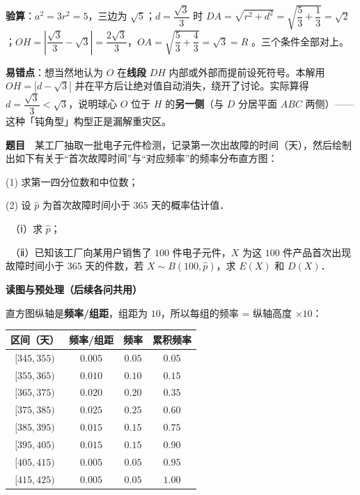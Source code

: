 \begin{gktip}
\textbf{验算}：$a^2=3r^2=5$，三边为 $\sqrt5$；$d=\dfrac{\sqrt3}{3}$ 时 $DA=\sqrt{r^2+d^2}=\sqrt{\dfrac53+\dfrac13}=\sqrt2$ ；$OH=\left|\dfrac{\sqrt3}{3}-\sqrt3\right|=\dfrac{2\sqrt3}{3}$，$OA=\sqrt{\dfrac53+\dfrac43}=\sqrt3=R$ 。三个条件全部对上。

\textbf{易错点}：想当然地认为 $O$ 在\textbf{线段} $DH$ 内部或外部而提前设死符号。本解用 $OH=\left|d-\sqrt3\right|$ 并在平方后让绝对值自动消失，绕开了讨论。实际算得 $d=\dfrac{\sqrt3}{3}<\sqrt3$，说明球心 $O$ 位于 $H$ 的\textbf{另一侧}（与 $D$ 分居平面 $ABC$ 两侧）——这种「钝角型」构型正是漏解重灾区。
\end{gktip}

\par\medskip



\textbf{题目}　某工厂抽取一批电子元件检测，记录第一次出故障的时间（天），然后绘制出如下有关于“首次故障时间”与“对应频率”的频率分布直方图：

\begin{center}\end{center}

  (1) 求第一四分位数和中位数；

  (2) 设 $\hat{p}$ 为首次故障时间小于 $365$ 天的概率估计值．

  　（ⅰ）求 $\hat{p}$；

  　（ⅱ）已知该工厂向某用户销售了 $100$ 件电子元件，$X$ 为这 $100$ 件产品首次出现故障时间小于 $365$ 天的件数，若 $X\sim B(100,\hat{p})$，求 $E(X)$ 和 $D(X)$．

\par\medskip

\textbf{读图与预处理（后续各问共用）}

直方图纵轴是\textbf{频率/组距}，组距为 $10$，所以每组的频率 = 纵轴高度 $\times10$：

\begin{center}
\begin{tabular}{cccc}
\toprule
区间（天） & 频率/组距 & 频率 & 累积频率 \\
\midrule
$[345,355)$ & $0.005$ & $0.05$ & $0.05$ \\
$[355,365)$ & $0.010$ & $0.10$ & $0.15$ \\
$[365,375)$ & $0.020$ & $0.20$ & $0.35$ \\
$[375,385)$ & $0.025$ & $0.25$ & $0.60$ \\
$[385,395)$ & $0.015$ & $0.15$ & $0.75$ \\
$[395,405)$ & $0.015$ & $0.15$ & $0.90$ \\
$[405,415)$ & $0.005$ & $0.05$ & $0.95$ \\
$[415,425)$ & $0.005$ & $0.05$ & $1.00$ \\
\bottomrule
\end{tabular}
\end{center}

